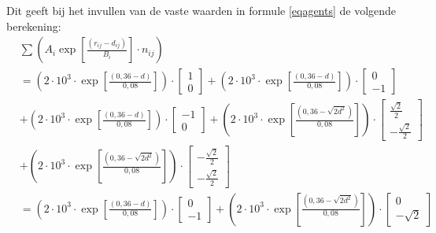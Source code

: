 \documentclass[12pt, letterpaper]{article}
\begin{document}
\noindent Dit geeft bij het invullen van de vaste waarden in formule \ref{eqagents} de volgende berekening:
\begin{equation}\label{02eq}
    \begin{aligned}
        &\sum\left(A_{i} \exp \left[\frac{\left(r_{i j}-d_{i            j}\right)}{B_{i}}\right] \cdot n_{i j}\right) \\
        &=\left(2 \cdot 10^{3} \cdot \exp     \left[\frac{(0,36-d)}{0,08}\right]\right)     \cdot\left[\begin{array}{c}
            1 \\
            0
        \end{array}\right]+\left(2 \cdot 10^{3} \cdot \exp     \left[\frac{(0,36-d)}{0,08}\right]\right)    \cdot\left[\begin{array}{c}
            0 \\
            -1
        \end{array}\right] \\
        &+\left(2 \cdot 10^{3} \cdot \exp     \left[\frac{(0,36-d)}{0,08}\right]\right)     \cdot\left[\begin{array}{c}
            -1 \\
            0
        \end{array}\right]+\left(2 \cdot 10^{3} \cdot \exp     \left[\frac{\left(0,36-\sqrt{2     d^{2}}\right)}{0,08}\right]\right)             \cdot\left[\begin{array}{c}
            \frac{\sqrt{2}}{2} \\
            -\frac{\sqrt{2}}{2}
        \end{array}\right] \\
        &+\left(2 \cdot 10^{3} \cdot \exp         \left[\frac{\left(0,36-\sqrt{2         d^{2}}\right)}{0,08}\right]\right)         \cdot\left[\begin{array}{c}
            -\frac{\sqrt{2}}{2} \\
            -\frac{\sqrt{2}}{2}
        \end{array}\right] \\
        &=\left(2 \cdot 10^{3} \cdot \exp     \left[\frac{(0,36-d)}{0,08}\right]\right)       \cdot\left[\begin{array}{c}
            0 \\
            -1
        \end{array}\right]+\left(2 \cdot 10^{3} \cdot \exp \left[\frac{\left(0,36-\sqrt{2     d^{2}}\right)}{0,08}\right]\right)            \cdot\left[\begin{array}{c}
            0 \\
            -\sqrt{2}
        \end{array}\right]
    \end{aligned}
\end{equation}
\end{document}
